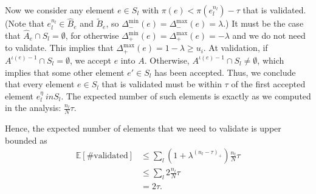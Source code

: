 Now we consider any element $e \in S_l$ with $\pi(e) < \pi(e_l^{n_l}) - \tau$ that is validated.
(Note that $e_l^{n_l} \in \hat{B}_e$ and $\tilde{B}_e$, so $\Delta_-^{\min}(e) = \Delta_-^{\max}(e) = \lambda$.)
It must be the case that $\hat{A}_e \cap S_l = \emptyset$, for otherwise $\Delta_+^{\min}(e) = \Delta_+^{\max}(e) = -\lambda$ and we do not need to validate.
This implies that $\Delta_+^{\max}(e) = 1-\lambda \geq u_i$.
At validation, if $A^{\iota(e)-1} \cap S_l = \emptyset$, we accept $e$ into $A$.
Otherwise, $A^{\iota(e)-1} \cap S_l \neq \emptyset$, which implies that some other element $e' \in S_l$ has been accepted.
Thus, we conclude that every element $e\in S_l$ that is validated must be within $\tau$ of the first accepted element $e_l^\eta \ in S_l$.
The expected number of such elements is exactly as we computed in the \hogwild analysis: $\frac{n_l}{N}\tau$.

Hence, the expected number of elements that we need to validate is upper bounded as
\begin{align*}
\mathbb{E}[\#\text{validated}]
&\leq \sum_l (1+\lambda^{(n_l-\tau)_+}) \frac{n_l}{N} \tau\\
&\leq \sum_l 2\frac{n_l}{N} \tau\\
&= 2\tau.
\end{align*}




